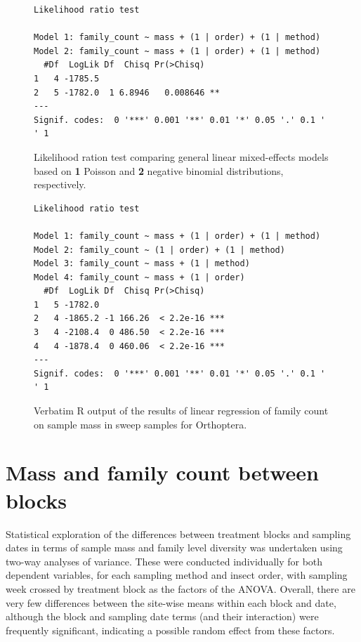 \documentclass[10pt,letterpaper,twocolumn]{article}
\begin{document}
\begin{figure}[h]
	\lstset{numbers=left}
	\lstset{xleftmargin=5mm,framexleftmargin=5mm}
	\begin{lstlisting}
Likelihood ratio test

Model 1: family_count ~ mass + (1 | order) + (1 | method)
Model 2: family_count ~ mass + (1 | order) + (1 | method)
  #Df  LogLik Df  Chisq Pr(>Chisq)   
1   4 -1785.5                        
2   5 -1782.0  1 6.8946   0.008646 **
---
Signif. codes:  0 '***' 0.001 '**' 0.01 '*' 0.05 '.' 0.1 ' ' 1
	\end{lstlisting}
	\caption{Likelihood ration test comparing general linear mixed-effects models based on \textbf{1} Poisson and \textbf{2} negative binomial distributions, respectively.}
	\label{fig:glmm_lrt}
	\smallskip
	\nointerlineskip
	\hrulefill
\end{figure}

\begin{figure}[h]
	\lstset{numbers=left}
	\lstset{xleftmargin=5mm,framexleftmargin=5mm}
	\begin{lstlisting}
Likelihood ratio test

Model 1: family_count ~ mass + (1 | order) + (1 | method)
Model 2: family_count ~ (1 | order) + (1 | method)
Model 3: family_count ~ mass + (1 | method)
Model 4: family_count ~ mass + (1 | order)
  #Df  LogLik Df  Chisq Pr(>Chisq)    
1   5 -1782.0                         
2   4 -1865.2 -1 166.26  < 2.2e-16 ***
3   4 -2108.4  0 486.50  < 2.2e-16 ***
4   4 -1878.4  0 460.06  < 2.2e-16 ***
---
Signif. codes:  0 '***' 0.001 '**' 0.01 '*' 0.05 '.' 0.1 ' ' 1
	\end{lstlisting}
	\caption{Verbatim R output of the results of linear regression of family count on sample mass in sweep samples for Orthoptera.}
	\label{fig:glmm_nb_lrt}
	\smallskip
	\nointerlineskip
	\hrulefill
\end{figure}

\clearpage
\newpage

\section{Mass and family count between blocks}\label{sec:blocks}
Statistical exploration of the differences between treatment blocks and sampling dates in terms of sample mass and family level diversity was undertaken using two-way analyses of variance.
These were conducted individually for both dependent variables, for each sampling method and insect order, with sampling week crossed by treatment block as the factors of the ANOVA.
Overall, there are very few differences between the site-wise means within each block and date, although the block and sampling date terms (and their interaction) were frequently significant, indicating a possible random effect from these factors.
\end{document}
